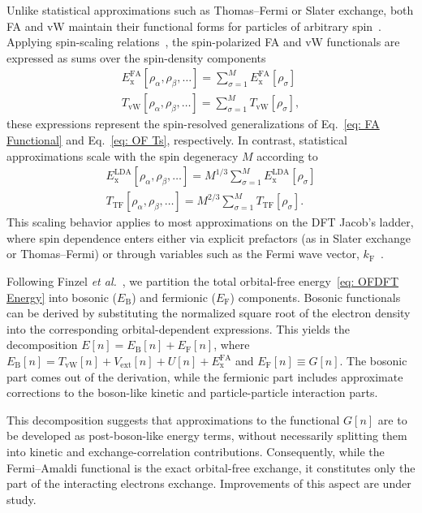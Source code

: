 \documentclass[%
 reprint,
 amsmath,amssymb,
 aps,
pra,
]{revtex4-2}
\begin{document}
Unlike statistical approximations such as Thomas--Fermi or Slater exchange, both FA and vW maintain their functional forms for particles of arbitrary spin~\cite{Bosko.2023.PRA.108.052803}. Applying spin-scaling relations~\cite{Oliver.1979.PRA.20.397, Bosko.2023.PRA.108.052803}, the spin-polarized FA and vW functionals are expressed as sums over the spin-density components
\begin{gather}
    E_{\text{x}}^{\text{FA}}
    [\rho_{\alpha}, \rho_{\beta},\dots]
    =
    \sum^M_{\sigma=1}
    E_{\text{x}}^{\text{FA}}
    [\rho_{\sigma}]\\
    T_{\text{vW}}
    [\rho_{\alpha}, \rho_{\beta},\dots]
    =
    \sum^M_{\sigma=1}
    T_{\text{vW}}
    [\rho_{\sigma}],
\end{gather}
these expressions represent the spin-resolved generalizations of Eq.~\eqref{eq: FA Functional} and Eq.~\eqref{eq: OF Ts}, respectively. In contrast, statistical approximations scale with the spin degeneracy $M$ according to
\begin{gather}
    E_{\text{x}}^{\text{LDA}}
    [\rho_{\alpha}, \rho_{\beta},\dots]
    =
    M^{1/3}
    \sum^M_{\sigma=1}
    E_{\text{x}}^{\text{LDA}}
    [\rho_{\sigma}]\\
    T_{\text{TF}}
    [\rho_{\alpha}, \rho_{\beta},\dots]
    =
    M^{2/3}
    \sum^M_{\sigma=1}
    T_{\text{TF}}
    [\rho_{\sigma}].
\end{gather}
This scaling behavior applies to most approximations on the DFT Jacob's ladder, where spin dependence enters either via explicit prefactors (as in Slater exchange or Thomas--Fermi) or through variables such as the Fermi wave vector, $k_{\text{F}}$~\cite{Bosko.2023.PRA.108.052803, Parr.1989.density}.

Following Finzel \textit{et al.}~\cite{Finzel.2018.APCS.34.650}, we partition the total orbital-free energy~\eqref{eq: OFDFT Energy} into bosonic ($E_{\text{B}}$) and fermionic ($E_{\text{F}}$) components. Bosonic functionals can be derived by substituting the normalized square root of the electron density into the corresponding orbital-dependent expressions. This yields the decomposition $E[n]=E_{\text{B}}[n]+E_{\text{F}}[n]$, where $E_{\text{B}}[n]=T_{\text{vW}}[n]+V_{\text{ext}}[n]+U[n]+E_{\text{x}}^{\text{FA}}$ and $E_{\text{F}}[n]\equiv G[n]$. The bosonic part comes out of the derivation, while the fermionic part includes approximate corrections to the boson-like kinetic and particle-particle interaction parts. 

This decomposition suggests that approximations to the functional $G[n]$ are to be developed as post-boson-like energy terms, without necessarily splitting them into kinetic and exchange-correlation contributions. Consequently, while the Fermi--Amaldi functional is the exact orbital-free exchange, it constitutes only the part of the interacting electrons exchange. Improvements of this aspect are under study.
\end{document}
